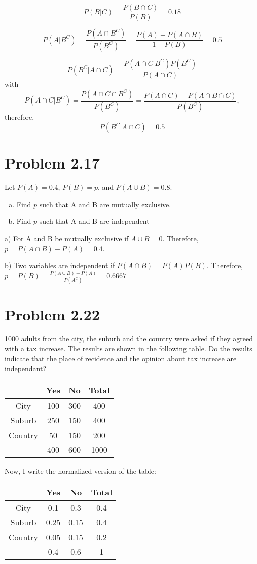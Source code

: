 \documentclass[10pt]{article}
\begin{document}
\[
P(B|C)=\frac{P(B\cap C)}{P(B)} = 0.18
\]

\[
P(A|B^C) = \frac{P(A\cap B^C)}{P(B^C)} = \frac{P(A)-P(A\cap B)}{1-P(B)} = 0.5
\]

\[
P(B^C|A\cap C) = \frac{P(A\cap C| B^C)P(B^C)}{P(A\cap C)}
\]
with 
\[
P(A\cap C|B^C)=\frac{P(A\cap C \cap B^C)}{P(B^C)}=\frac{P(A\cap C)-P(A\cap B\cap C)}{P(B^C)},
\] 
therefore,
\[
P(B^C|A\cap C) = 0.5
\]

\section{Problem 2.17}
Let $P(A)=0.4$, $P(B)=p$, and $P(A\cup B)=0.8$.


\begin{enumerate}[a)] %
\item  Find $p$ such that A and B are mutually exclusive.
\item  Find $p$ such that A and B are independent
\end{enumerate}

a) For A and B be mutually exclusive if $A\cup B=0$. Therefore, \\  $p=P(A\cap B)-P(A)=0.4$. 


b) Two variables are independent if $P(A\cap B)=P(A)P(B)$. Therefore,
 $p=P(B) = \frac{P(A\cup B)-P(A)}{P(A^C)}= 0.6667$ 


\section{Problem 2.22}
1000 adults from the city, the suburb and the country were asked if they agreed with a tax increase. 
The results are shown in the following table. Do the results indicate that the place of recidence 
and the opinion about tax increase are independant?


\begin{tabular}{c |c c| c }

          & Yes   & No    & Total \\ \hline
  City    & 100   & 300   & 400 \\ 
  Suburb  & 250   & 150   & 400 \\
  Country & 50    & 150   & 200 \\ \hline
          & 400   & 600   & 1000 \\
\end{tabular}






Now, I write the normalized version of the table:
\begin{tabular}{c |c c| c }

          & Yes    & No    & Total \\ \hline
  City    & 0.1    & 0.3   & 0.4 \\ 
  Suburb  & 0.25   & 0.15  & 0.4 \\
  Country & 0.05   & 0.15  & 0.2 \\ \hline
          & 0.4    & 0.6   & 1 \\
\end{tabular}
\end{document}

